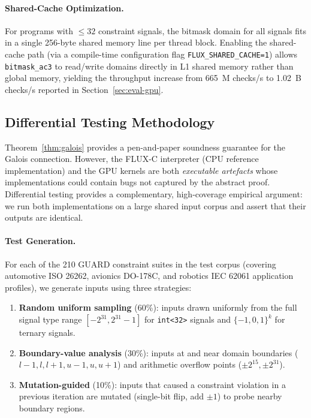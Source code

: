 \documentclass[sigplan,review,anonymous]{acmart}
\begin{document}
\paragraph{Shared-Cache Optimization.}
For programs with $\le 32$ constraint signals, the bitmask domain for all
signals fits in a single 256-byte shared memory line per thread block.
Enabling the shared-cache path (via a compile-time configuration flag
\texttt{FLUX\_SHARED\_CACHE=1}) allows \texttt{bitmask\_ac3} to read/write
domains directly in L1 shared memory rather than global memory, yielding
the throughput increase from 665~M checks/s to 1.02~B checks/s reported
in Section~\ref{sec:eval-gpu}.

\subsection{Differential Testing Methodology}
\label{sec:difftest}

Theorem~\ref{thm:galois} provides a pen-and-paper soundness guarantee for
the Galois connection. However, the FLUX-C interpreter (CPU reference
implementation) and the GPU kernels are both \emph{executable artefacts}
whose implementations could contain bugs not captured by the abstract proof.
Differential testing provides a complementary, high-coverage empirical
argument: we run both implementations on a large shared input corpus and
assert that their outputs are identical.

\paragraph{Test Generation.}
For each of the 210 GUARD constraint suites in the test corpus
(covering automotive ISO 26262, avionics DO-178C, and robotics IEC 62061
application profiles), we generate inputs using three strategies:
\begin{enumerate}
  \item \textbf{Random uniform sampling} (60\%): inputs drawn uniformly
        from the full signal type range $[-2^{31}, 2^{31}-1]$ for
        \texttt{int<32>} signals and $\{-1, 0, 1\}^k$ for ternary signals.
  \item \textbf{Boundary-value analysis} (30\%): inputs at and near domain
        boundaries ($l-1, l, l+1, u-1, u, u+1$) and arithmetic overflow
        points ($\pm 2^{15}, \pm 2^{31}$).
  \item \textbf{Mutation-guided} (10\%): inputs that caused a constraint
        violation in a previous iteration are mutated (single-bit flip, add
        $\pm 1$) to probe nearby boundary regions.
\end{enumerate}
\end{document}
